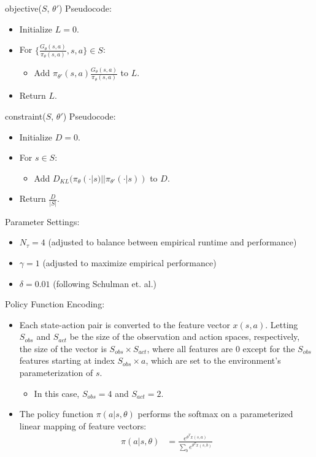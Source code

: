 \documentclass[a4paper]{article}
\begin{document}
objective($S$, $\theta'$) Pseudocode:
\begin{itemize}
    \item Initialize $L = 0$.
    \item For $\{\frac{G_{\theta}(s, a)}
            {\pi_{\theta}(s, a)}, s, a\} \in S$:
    \begin{itemize}
        \item Add $\pi_{\theta'}(s, a) 
            \frac{G_{\theta}(s, a)} {\pi_{\theta}(s, a)}$ to $L$.
    \end{itemize}
    \item Return $L$.
\end{itemize}
constraint($S$, $\theta'$) Pseudocode:
\begin{itemize}
    \item Initialize $D = 0$.
    \item For $s \in S$:
    \begin{itemize}
        \item Add $D_{KL}(\pi_{\theta}(\cdot | s) 
            || \pi_{\theta'}(\cdot | s))$ to $D$.
    \end{itemize}
    \item Return $\frac{D}{|S|}$.
\end{itemize}
Parameter Settings:
\begin{itemize}
    \item $N_{\tau} = 4$ (adjusted to balance between empirical runtime and
        performance) %
    \item $\gamma = 1$ (adjusted to maximize empirical performance)%
    \item $\delta = 0.01$ (following Schulman et. al.)%
\end{itemize}
Policy Function Encoding:
\begin{itemize}
    \item Each state-action pair is converted to the feature vector $x(s, a)$.
        Letting $S_{obs}$ and $S_{act}$ be the size of the observation and
        action spaces, respectively, the size of the vector is $S_{obs} \times
        S_{act}$, where all features are $0$ except for the $S_{obs}$ features
        starting at index $S_{obs} \times a$, which are set to the
        environment's parameterization of $s$.
    \begin{itemize}
        \item In this case, $S_{obs} = 4$ and $S_{act} = 2$.
    \end{itemize}
    \item The policy function $\pi(a | s, \theta)$ performs the softmax on a
        parameterized linear mapping of feature vectors:
        \begin{align*}
            \pi(a | s, \theta) &= \frac{e^{\theta^T x(s, a)}}
            {\sum_{b} e^{\theta^T x(s, b)}}\\
        \end{align*}
\end{itemize}
\end{document}
